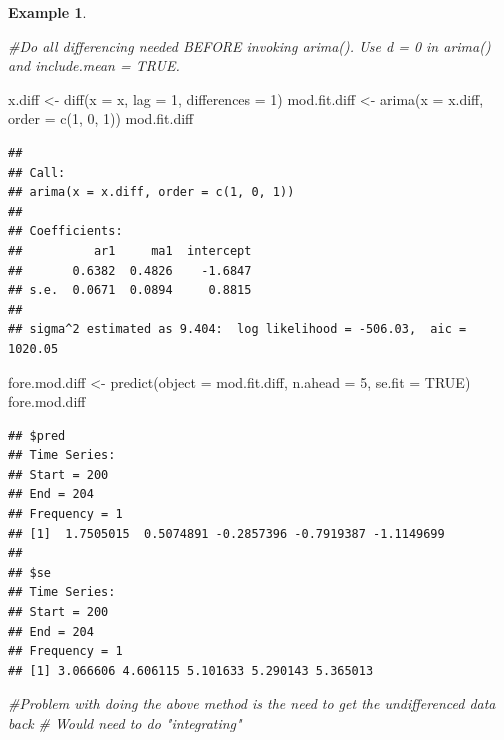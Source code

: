 \documentclass[
]{book}
\newenvironment{Shaded}{\begin{snugshade}}{\end{snugshade}}
\newcommand{\AttributeTok}[1]{\textcolor[rgb]{0.77,0.63,0.00}{#1}}
\newcommand{\CommentTok}[1]{\textcolor[rgb]{0.56,0.35,0.01}{\textit{#1}}}
\newcommand{\ConstantTok}[1]{\textcolor[rgb]{0.00,0.00,0.00}{#1}}
\newcommand{\DecValTok}[1]{\textcolor[rgb]{0.00,0.00,0.81}{#1}}
\newcommand{\FunctionTok}[1]{\textcolor[rgb]{0.00,0.00,0.00}{#1}}
\newcommand{\NormalTok}[1]{#1}
\newcommand{\OtherTok}[1]{\textcolor[rgb]{0.56,0.35,0.01}{#1}}
\theoremstyle{definition}
\theoremstyle{definition}
\newtheorem{example}{Example}[chapter]
\theoremstyle{definition}
\theoremstyle{definition}
\theoremstyle{remark}
\begin{document}
\begin{example}
\begin{Shaded}
\begin{Highlighting}[]
\CommentTok{\#Do all differencing needed BEFORE invoking arima(). Use d = 0 in arima() and include.mean = TRUE.}

\NormalTok{x.diff }\OtherTok{\textless{}{-}} \FunctionTok{diff}\NormalTok{(}\AttributeTok{x =}\NormalTok{ x, }\AttributeTok{lag =} \DecValTok{1}\NormalTok{, }\AttributeTok{differences =} \DecValTok{1}\NormalTok{)}
\NormalTok{mod.fit.diff }\OtherTok{\textless{}{-}} \FunctionTok{arima}\NormalTok{(}\AttributeTok{x =}\NormalTok{ x.diff, }\AttributeTok{order =} \FunctionTok{c}\NormalTok{(}\DecValTok{1}\NormalTok{, }\DecValTok{0}\NormalTok{, }\DecValTok{1}\NormalTok{))}
\NormalTok{mod.fit.diff}
\end{Highlighting}
\end{Shaded}

\begin{verbatim}
## 
## Call:
## arima(x = x.diff, order = c(1, 0, 1))
## 
## Coefficients:
##          ar1     ma1  intercept
##       0.6382  0.4826    -1.6847
## s.e.  0.0671  0.0894     0.8815
## 
## sigma^2 estimated as 9.404:  log likelihood = -506.03,  aic = 1020.05
\end{verbatim}

\begin{Shaded}
\begin{Highlighting}[]
\NormalTok{fore.mod.diff }\OtherTok{\textless{}{-}} \FunctionTok{predict}\NormalTok{(}\AttributeTok{object =}\NormalTok{ mod.fit.diff, }\AttributeTok{n.ahead =} \DecValTok{5}\NormalTok{, }\AttributeTok{se.fit =} \ConstantTok{TRUE}\NormalTok{)}
\NormalTok{fore.mod.diff}
\end{Highlighting}
\end{Shaded}

\begin{verbatim}
## $pred
## Time Series:
## Start = 200 
## End = 204 
## Frequency = 1 
## [1]  1.7505015  0.5074891 -0.2857396 -0.7919387 -1.1149699
## 
## $se
## Time Series:
## Start = 200 
## End = 204 
## Frequency = 1 
## [1] 3.066606 4.606115 5.101633 5.290143 5.365013
\end{verbatim}

\begin{Shaded}
\begin{Highlighting}[]
  \CommentTok{\#Problem with doing the above method is the need to get the undifferenced data back}
  \CommentTok{\#  Would need to do "integrating"}
\end{Highlighting}
\end{Shaded}

\end{example}
\end{document}
